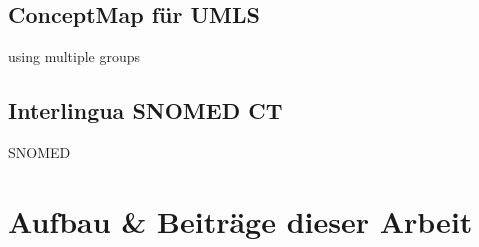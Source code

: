 \subsection{ConceptMap für UMLS}

using multiple groups \cite{saripalle2019representing}

\begin{comment}
\bibitem{UMLS FHIR}
``An Interoperable UMLS Terminology Service Using FHIR'' \newline
\url{https://www.mdpi.com/1999-5903/12/11/199}

\bibitem{UMLS FHIR 2}
``Representing UMLS knowledge using FHIR Terminological Resources'' \newline
\url{https://ieeexplore.ieee.org/abstract/document/8983305}
\end{comment}

\subsection{Interlingua SNOMED CT}

SNOMED \cite{icd10-to-snomed}

\section{Aufbau \& Beiträge dieser Arbeit}







%



